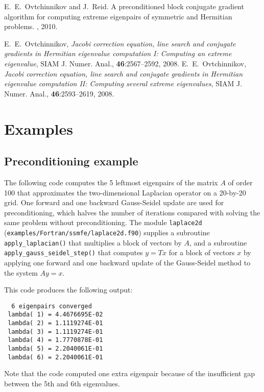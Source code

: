 
E.~E.~Ovtchinnikov and J.~Reid.
A preconditioned block conjugate gradient
algorithm for computing extreme eigenpairs
of symmetric and Hermitian problems.
\report, 2010.

E.~E.~Ovtchinnikov,
{\em Jacobi correction equation, line search and
conjugate gradients in Hermitian eigenvalue computation I:
Computing an extreme eigenvalue},
SIAM J. Numer. Anal., {\bf 46}:2567--2592, 2008.
E.~E.~Ovtchinnikov,
{\em Jacobi correction equation, line search and
conjugate gradients in Hermitian eigenvalue computation II:
Computing several extreme eigenvalues},
SIAM J. Numer. Anal., {\bf 46}:2593--2619, 2008.


\section{Examples}

\subsection{Preconditioning example}
\label{sec:ex.prec}

The following code 
computes the 5 leftmost eigenpairs of 
the matrix $A$ of order 100 that approximates 
the two-dimensional Laplacian operator
on a 20-by-20 grid.
One forward and one backward Gauss-Seidel update
are used for preconditioning,
which halves the number of iterations
compared with solving the same problem without preconditioning.
The module {\tt laplace2d} (\texttt{examples/Fortran/ssmfe/laplace2d.f90})
supplies a subroutine {\tt apply\_laplacian()}
that multiplies a block of vectors by $A$,
and a subroutine 
{\tt apply\_gauss\_seidel\_step()}
that computes $y = T x$ for a block of vectors $x$
by applying one forward and one backward update
of the Gauss-Seidel method to the system $A y = x$.

This code produces the following output:
\begin{verbatim}
  6 eigenpairs converged
 lambda( 1) = 4.4676695E-02
 lambda( 2) = 1.1119274E-01
 lambda( 3) = 1.1119274E-01
 lambda( 4) = 1.7770878E-01
 lambda( 5) = 2.2040061E-01
 lambda( 6) = 2.2040061E-01
\end{verbatim}

Note that the code computed one extra eigenpair
because of the insufficient gap between the 5th and 6th
eigenvalues.

